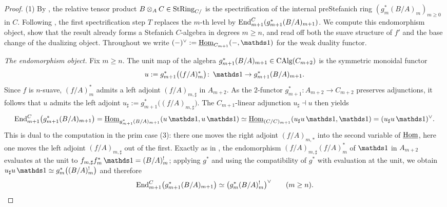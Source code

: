 \documentclass[11pt]{book}
\begin{document}
	\begin{proof}
		(1) By , the relative tensor product $B \otimes_A C \in {\textup{StRing}}_{C/}$ is the spectrification of the internal preStefanich ring $(g^*_m(B/A)_m)_{m \geq 0}$ in $C$. Following , the first spectrification step $T$ replaces the $m$-th level by $\operatorname{End}^C_{m+1}(g^*_{m+1}(B/A)_{m+1})$. We compute this endomorphism object, show that the result already forms a Stefanich $C$-algebra in degrees $m \geq n$, and read off both the suave structure of $f'$ and the base change of the dualizing object. Throughout we write $(-)^\vee := \iHom_{C_{m+1}}(-,\unit)$ for the weak duality functor.

		\emph{The endomorphism object.} Fix $m \geq n$. The unit map of the algebra $g^*_{m+1}(B/A)_{m+1} \in {\textup{CAlg}}(C_{m+2})$ is the symmetric monoidal functor
		\[
			u := g^*_{m+1}\bigl((f/A)^*_m\bigr)\colon \unit \to g^*_{m+1}(B/A)_{m+1}.
		\]
		Since $f$ is $n$-suave, $(f/A)^*_m$ admits a left adjoint $(f/A)_{m,\sharp}$ in $A_{m+2}$. As the $2$-functor $g^*_{m+1}\colon A_{m+2} \to C_{m+2}$ preserves adjunctions, it follows that $u$ admits the left adjoint $u_\sharp := g^*_{m+1}\bigl((f/A)_{m,\sharp}\bigr)$. The $C_{m+1}$-linear adjunction $u_\sharp \dashv u$ then yields
		\[
			\End^C_{m+1}\bigl(g^*_{m+1}(B/A)_{m+1}\bigr) = \iHom_{g^*_{m+1}(B/A)_{m+1}}(u\unit, u\unit) \simeq \iHom_{(C/C)_{m+1}}(u_\sharp u\unit, \unit) = (u_\sharp u\unit)^\vee.
		\]
		This is dual to the computation in the prim case (3): there one moves the right adjoint $(f/A)_{m,*}$ into the second variable of $\operatorname{\underline{\operatorname{Hom}}}$, here one moves the left adjoint $(f/A)_{m,\sharp}$ out of the first. Exactly as in , the endomorphism $(f/A)_{m,\sharp}(f/A)^*_m$ of $\unit$ in $A_{m+2}$ evaluates at the unit to $f_{m,\sharp}f^*_m\unit = (B/A)^!_m$; applying $g^*$ and using the compatibility of $g^*$ with evaluation at the unit, we obtain $u_\sharp u\unit \simeq g^*_m\bigl((B/A)^!_m\bigr)$ and therefore
		\[
			\operatorname{End}^C_{m+1}\bigl(g^*_{m+1}(B/A)_{m+1}\bigr) \simeq \bigl(g^*_m(B/A)^!_m\bigr)^\vee \qquad (m \geq n).
		\]


\end{proof}
\end{document}
